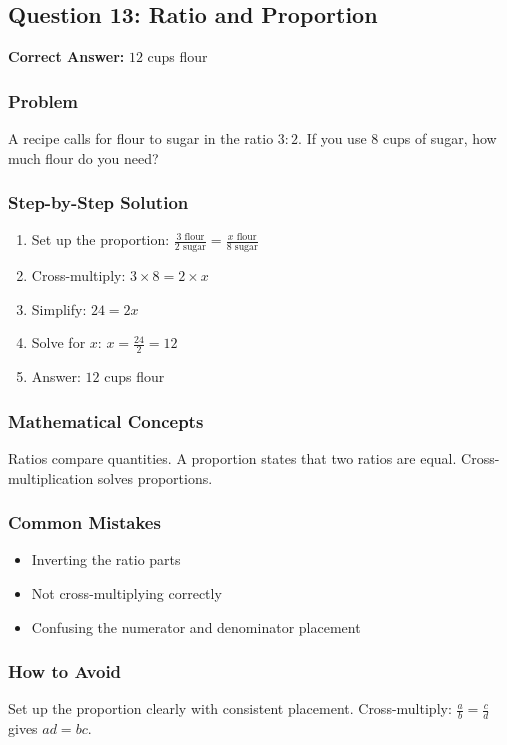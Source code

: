 \documentclass[12pt,a4paper]{article}
\begin{document}
\subsection*{Question 13: Ratio and Proportion}

\textbf{Correct Answer:} $12$ cups flour

\subsubsection*{Problem}
A recipe calls for flour to sugar in the ratio $3:2$. If you use $8$ cups of sugar, how much flour do you need?

\subsubsection*{Step-by-Step Solution}
\begin{enumerate}
    \item Set up the proportion: $\frac{3 \text{ flour}}{2 \text{ sugar}} = \frac{x \text{ flour}}{8 \text{ sugar}}$
    \item Cross-multiply: $3 \times 8 = 2 \times x$
    \item Simplify: $24 = 2x$
    \item Solve for $x$: $x = \frac{24}{2} = 12$
    \item Answer: $12$ cups flour
\end{enumerate}

\subsubsection*{Mathematical Concepts}
Ratios compare quantities. A proportion states that two ratios are equal. Cross-multiplication solves proportions.

\subsubsection*{Common Mistakes}
\begin{itemize}
    \item Inverting the ratio parts
    \item Not cross-multiplying correctly
    \item Confusing the numerator and denominator placement
\end{itemize}

\subsubsection*{How to Avoid}
Set up the proportion clearly with consistent placement. Cross-multiply: $\frac{a}{b} = \frac{c}{d}$ gives $ad = bc$.
\end{document}
